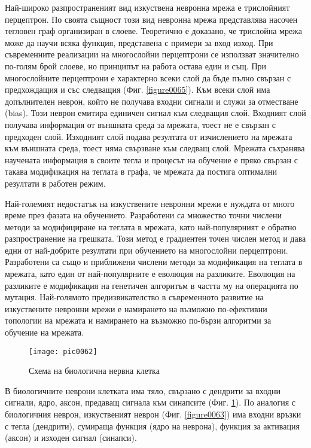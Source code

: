 Най-широко разпространеният вид изкуствена невронна мрежа е трислойният перцептрон. По своята същност този вид невронна мрежа представлява насочен тегловен граф организиран в слоеве. Теоретично е доказано, че трислойна мрежа може да научи всяка функция, представена с примери за вход изход. При съвременните реализации на многослойни перцептрони се използват значително по-голям брой слоеве, но принципът на работа остава един и същ. При многослойните перцептрони е характерно всеки слой да бъде пълно свързан с предхождащия и със следващия (Фиг. \ref{figure0065}). Към всеки слой има допълнителен неврон, който не получава входни сигнали и служи за отместване (bias). Този неврон емитира единичен сигнал към следващия слой. Входният слой получава информация от външната среда за мрежата, тоест не е свързан с предходен слой. Изходният слой подава резултата от изчислението на мрежата към външната среда, тоест няма свързване към следващ слой. Мрежата съхранява научената информация в своите тегла и процесът на обучение е пряко свързан с такава модификация на теглата в графа, че мрежата да постига оптимални резултати в работен режим. 

Най-големият недостатък на изкуствените невронни мрежи е нуждата от много време през фазата на обучението. Разработени са множество точни числени методи за модифициране на теглата в мрежата, като най-популярният е обратно разпространение на грешката. Този метод е градиентен точен числен метод и дава едни от най-добрите резултати при обучението на многослойни перцептрони. Разработени са също и приближени числени методи за модификация на теглата в мрежата, като един от най-популярните е еволюция на разликите. Еволюция на разликите е модификация на генетичен алгоритъм в частта му на операцията по мутация. Най-голямото предизвикателство в съвременното развитие на изкуствените невронни мрежи е намирането на възможно по-ефективни топологии на мрежата и намирането на възможно по-бързи алгоритми за обучение на мрежата. 

\begin{figure}[h!]
  \centering
  \texttt{[image: pic0062]}
  \caption{Схема на биологична нервна клетка}
\label{figure0062}
\end{figure}
\FloatBarrier

В биологичните неврони клетката има тяло, свързано с дендрити за входни сигнали, ядро, аксон, предаващ сигнала към синапсите (Фиг. \ref{figure0062}). По аналогия с биологичния неврон, изкуственият неврон (Фиг. \ref{figure0063}) има входни връзки с тегла (дендрити), сумираща функция (ядро на неврона), функция за активация (аксон) и изходен сигнал (синапси).


